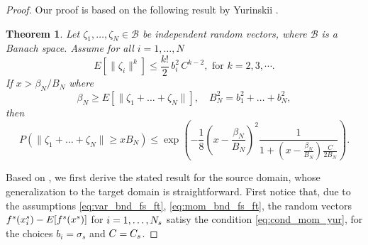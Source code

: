 \documentclass[review,supplement,onefignum,onetabnum]{siamonline250211}
\newtheorem*{utheorem}{Theorem}
\begin{document}
\begin{proof}
    \label{pf_lem_bernstein_src_trg}
Our proof is based on the following result by Yurinskii \cite{Yurinski76}.

\begin{utheorem} \cite[Theorem 2.1]{Yurinski76}
Let $\zeta_1, \dots, \zeta_N \in \mathcal{B}$ be independent random vectors, where $\mathcal{B}$ is a Banach space. Assume for all $i=1, \dots, N$
%
\begin{equation}
\label{eq:cond_mom_yur}
E[ \| \zeta_i \|^k ] \leq \frac{k!}{2} \, b_i^2 \, C^{k-2}, \text{ for } k=2,3, \cdots.
\end{equation}
%
If $x>\beta_N / B_N$ where
%
\begin{equation}
\label{eq:cond_betan_Bn}
\beta_N \geq E[ \| \zeta_1 + \dots + \zeta_N \| ], 
\quad
B_N^2 = b_1^2 + \dots + b_N^2,
\end{equation}
%
then 
\begin{equation*}
P\left(   \| \zeta_1 + \dots + \zeta_N \|  \geq x B_N  \right) \leq
  \exp \left(  
  -\frac{1}{8}\left(x-\frac{\beta_N}{B_N}\right)^2 \frac{1}{1+\left(x-\frac{\beta_N}{B_N} \right)\frac{C}{2 B_N}}
   \right).
\end{equation*}
%
\end{utheorem}

Based on \cite[Theorem 2.1]{Yurinski76}, we first derive the stated result for the source domain, whose generalization to the target domain is straightforward. First notice that, due to the assumptions \eqref{eq:var_bnd_fs_ft}, \eqref{eq:mom_bnd_fs_ft}, the random vectors $ f^s(x^s_i)- E[f^s(x^s)]$ for $i=1, \dots, N_s$ satisy the condition \eqref{eq:cond_mom_yur}, for the choices $b_i=\sigma_s$ and $C=C_s$. 


\end{proof}
\end{document}

